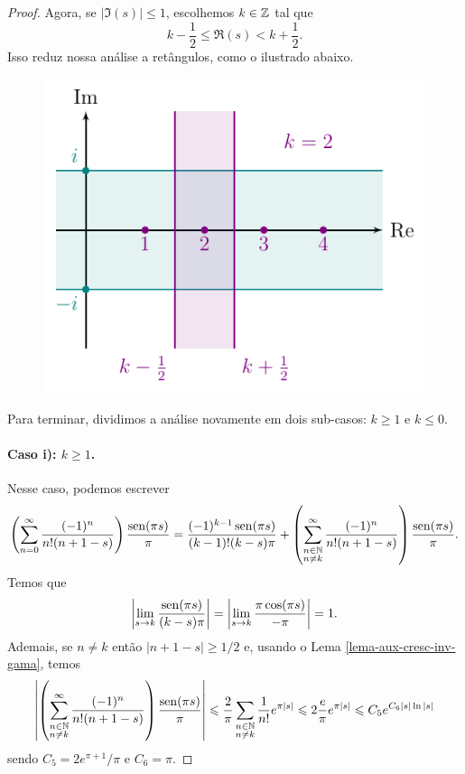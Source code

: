 \begin{proof}
        Agora, se $|\Im(s)| \leq 1$, escolhemos $k\in\mathbb{Z}$ tal que
        \[
        k - \frac{1}{2} \leq \Re(s) < k + \frac{1}{2}.
        \]
        Isso reduz nossa análise a retângulos, como o ilustrado abaixo.
        \begin{figure}[H]\centering
            \includegraphics{Figuras/K>=1.pdf}
        \end{figure}
        Para terminar, dividimos a análise novamente em dois sub-casos: $k\geq 1$ e $k\leq 0$.
        
        \paragraph{Caso i): $k\geq 1$.} Nesse caso, podemos escrever
        \begin{align*}
            \left(\sum_{n=0}^{\infty} \frac{(-1)^n}{n!(n+1-s)}\right)\frac{\operatorname{sen}(\pi s)}{\pi}
            = \frac{(-1)^{k-1}\operatorname{sen}(\pi s)}{(k-1)!(k-s)\pi} +
            \left(\sum_{\substack{n\in\mathbb{N} \\ n\neq k}}^{\infty} 
            \frac{(-1)^n}{n!(n+1-s)}\right)\frac{\operatorname{sen}(\pi s)}{\pi}.
        \end{align*}
        Temos que
        \[
        \left|\lim_{s\to k} \frac{\operatorname{sen}(\pi s)}{(k-s)\pi}\right| 
        = \left|\lim_{s\to k} \frac{\pi\cos(\pi s)}{-\pi}\right|
        = 1.
        \]
        Ademais, se $n\neq k$ então $|n+1-s| \geq 1/2$ e, usando o
        Lema \ref{lema-aux-cresc-inv-gama}, temos
        \begin{align*}
            \left|\left(\sum_{\substack{n\in\mathbb{N} \\ n\neq k}}^{\infty} 
            \frac{(-1)^n}{n!(n+1-s)}\right)\frac{\operatorname{sen}(\pi s)}{\pi}\right|
            \leqslant \frac{2}{\pi}\sum_{\substack{n\in\mathbb{N} \\ n\neq k}} \frac{1}{n!}e^{\pi |s|}
            \leqslant 2\frac{e}{\pi} e^{\pi |s|}
            \leqslant C_5e^{C_6 |s|\ln|s|}
        \end{align*}
        sendo $C_5 = 2e^{\pi + 1}/\pi$ e $C_6 = \pi$.

\end{proof}
